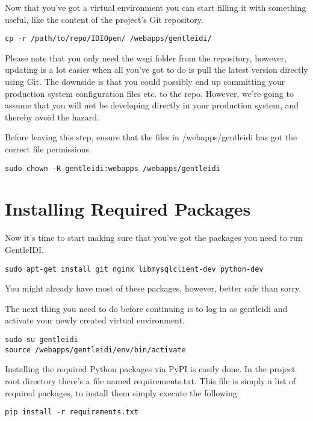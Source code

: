 Now that you've got a virtual environment you can start
filling it with something useful, like the content of the
project's Git repository.

\begin{verbatim}
cp -r /path/to/repo/IDIOpen/ /webapps/gentleidi/
\end{verbatim}

Please note that you only need the wsgi folder from the repository, however,
updating is a lot easier when all you've got to do is
pull the latest version directly using Git. The downside is that you
could possibly end up committing your production system configuration
files etc. to the repo. However, we're going to assume
that you will not be developing directly in your production system, and
thereby avoid the hazard.

Before leaving this step, ensure that the files in /webapps/gentleidi
has got the correct file permissions.

\begin{verbatim}
sudo chown -R gentleidi:webapps /webapps/gentleidi
\end{verbatim}

\section{Installing Required Packages}

Now it's time to start making sure that
you've got the packages you need to run GentleIDI.

\begin{verbatim}
sudo apt-get install git nginx libmysqlclient-dev python-dev
\end{verbatim}

You might already have most of these packages, however, better safe than
sorry.

The next thing you need to do before continuing is to log in as
gentleidi and activate your newly created virtual environment.

\begin{verbatim}
sudo su gentleidi
source /webapps/gentleidi/env/bin/activate
\end{verbatim}

Installing the required Python packages via PyPI is easily done. In the
project root directory there's a file named
requirements.txt. This file is simply a list of required packages, to
install them simply execute the following:

\begin{verbatim}
pip install -r requirements.txt
\end{verbatim}

